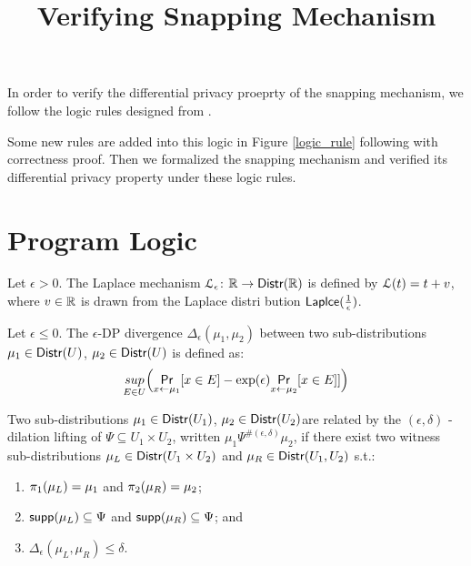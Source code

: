 \documentclass[a4paper,11pt]{article}
\begin{document}
\title{Verifying Snapping Mechanism}

\maketitle
In order to verify the differential privacy proeprty of the snapping mechanism\cite{mironov2012significance}, we follow the logic rules designed from \cite{barthe2016proving}.

Some new rules are added into this logic in Figure \ref{logic_rule} following with correctness proof. Then we formalized the snapping mechanism and verified its differential privacy property under these logic rules.

\section{Program Logic}
\begin{defn}
Let $\epsilon > 0$. The Laplace mechanism  $\mathcal{L}_{\epsilon}$: $\mathbb{R} \to \mathsf{Distr}(\mathbb{R})$ is defined by $\mathcal{L}(t) = t + v$, where $v \in \mathbb{R}$ is drawn from the Laplace distri bution $\mathsf{Laplce}(\frac{1}{\epsilon})$.
\end{defn}

\begin{defn}
Let $\epsilon \leq 0$. The $\epsilon${\text -DP divergence} $\Delta_{\epsilon}(\mu_1, \mu_2)$ between two sub-distributions $\mu_1 \in \mathsf{Distr}(U)$, $\mu_2 \in \mathsf{Distr}(U)$ is defined as:
\[	
	\underset{E \in U}{sup}\Big(\underset{x \leftarrow \mu_1}{\mathsf{Pr}}[x \in E] - \exp(\epsilon) \underset{x \leftarrow \mu_2}{\mathsf{Pr}}[x \in  E]]\Big)
\]

\end{defn}

\begin{defn}
Two sub-distributions $\mu_1 \in \mathsf{Distr}(U_1)$, $\mu_2 \in \mathsf{Distr}(U_2)$are related by the $(\epsilon, \delta)$ - dilation lifting of $\Psi \subseteq U_1 \times U_2$, written $\mu_1 \Psi^{\#(\epsilon, \delta)} \mu_2$, if there exist two witness sub-distributions $\mu_L \in \mathsf{Distr}(U_1 \times U_2)$ and $\mu_R \in \mathsf{Distr}(U_1, U_2)$ s.t.:
\begin{enumerate}
	\item $\pi_1(\mu_L) = \mu_1$ and $\pi_2(\mu_R) = \mu_2$;
	\item $\mathsf{supp}(\mu_L) \subseteq \Psi$ and $\mathsf{supp}(\mu_R) \subseteq \Psi$; and
	\item $\Delta_{\epsilon}(\mu_L, \mu_R) \leq \delta$.
\end{enumerate}
\end{defn}
\end{document}
